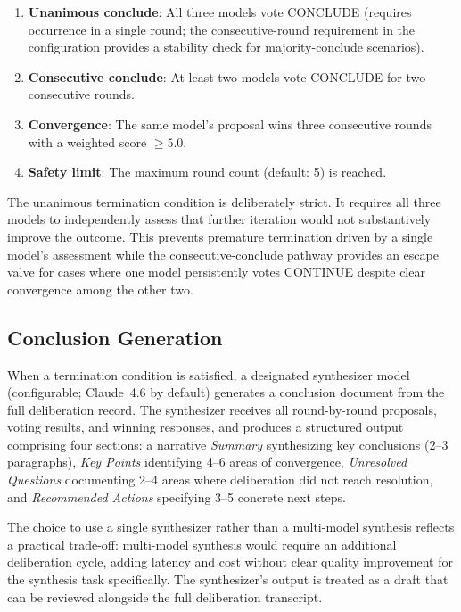 \documentclass[11pt,a4paper]{article}
\begin{document}
\begin{enumerate}[nosep]
    \item \textbf{Unanimous conclude}: All three models vote CONCLUDE (requires occurrence in a single round; the consecutive-round requirement in the configuration provides a stability check for majority-conclude scenarios).
    \item \textbf{Consecutive conclude}: At least two models vote CONCLUDE for two consecutive rounds.
    \item \textbf{Convergence}: The same model's proposal wins three consecutive rounds with a weighted score $\geq 5.0$.
    \item \textbf{Safety limit}: The maximum round count (default: 5) is reached.
\end{enumerate}

The unanimous termination condition is deliberately strict. It requires all three models to independently assess that further iteration would not substantively improve the outcome. This prevents premature termination driven by a single model's assessment while the consecutive-conclude pathway provides an escape valve for cases where one model persistently votes CONTINUE despite clear convergence among the other two.

\subsection{Conclusion Generation}
\label{sec:conclusion_generation}

When a termination condition is satisfied, a designated synthesizer model (configurable; Claude~4.6 by default) generates a conclusion document from the full deliberation record. The synthesizer receives all round-by-round proposals, voting results, and winning responses, and produces a structured output comprising four sections: a narrative \emph{Summary} synthesizing key conclusions (2--3 paragraphs), \emph{Key Points} identifying 4--6 areas of convergence, \emph{Unresolved Questions} documenting 2--4 areas where deliberation did not reach resolution, and \emph{Recommended Actions} specifying 3--5 concrete next steps.

The choice to use a single synthesizer rather than a multi-model synthesis reflects a practical trade-off: multi-model synthesis would require an additional deliberation cycle, adding latency and cost without clear quality improvement for the synthesis task specifically. The synthesizer's output is treated as a draft that can be reviewed alongside the full deliberation transcript.
\end{document}
